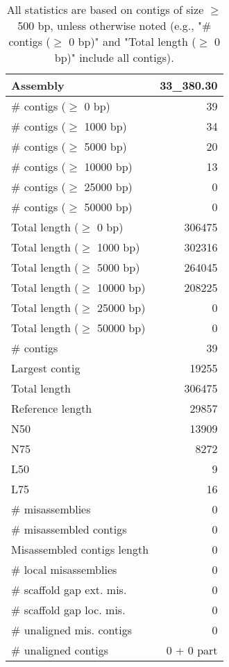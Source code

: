 \documentclass[12pt,a4paper]{article}
\begin{document}
\begin{table}[ht]
\begin{center}
\caption{All statistics are based on contigs of size $\geq$ 500 bp, unless otherwise noted (e.g., "\# contigs ($\geq$ 0 bp)" and "Total length ($\geq$ 0 bp)" include all contigs).}
\begin{tabular}{|l*{1}{|r}|}
\hline
Assembly & 33\_380.30 \\ \hline
\# contigs ($\geq$ 0 bp) & 39 \\ \hline
\# contigs ($\geq$ 1000 bp) & 34 \\ \hline
\# contigs ($\geq$ 5000 bp) & 20 \\ \hline
\# contigs ($\geq$ 10000 bp) & 13 \\ \hline
\# contigs ($\geq$ 25000 bp) & 0 \\ \hline
\# contigs ($\geq$ 50000 bp) & 0 \\ \hline
Total length ($\geq$ 0 bp) & 306475 \\ \hline
Total length ($\geq$ 1000 bp) & 302316 \\ \hline
Total length ($\geq$ 5000 bp) & 264045 \\ \hline
Total length ($\geq$ 10000 bp) & 208225 \\ \hline
Total length ($\geq$ 25000 bp) & 0 \\ \hline
Total length ($\geq$ 50000 bp) & 0 \\ \hline
\# contigs & 39 \\ \hline
Largest contig & 19255 \\ \hline
Total length & 306475 \\ \hline
Reference length & 29857 \\ \hline
N50 & 13909 \\ \hline
N75 & 8272 \\ \hline
L50 & 9 \\ \hline
L75 & 16 \\ \hline
\# misassemblies & 0 \\ \hline
\# misassembled contigs & 0 \\ \hline
Misassembled contigs length & 0 \\ \hline
\# local misassemblies & 0 \\ \hline
\# scaffold gap ext. mis. & 0 \\ \hline
\# scaffold gap loc. mis. & 0 \\ \hline
\# unaligned mis. contigs & 0 \\ \hline
\# unaligned contigs & 0 + 0 part \\ \hline

\end{tabular}
\end{center}
\end{table}
\end{document}
